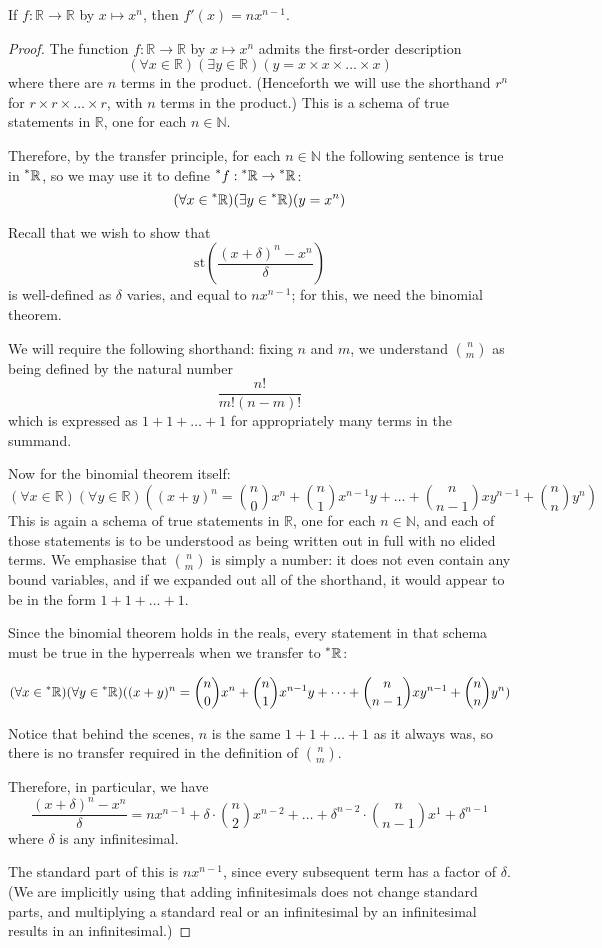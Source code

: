 \documentclass[11pt]{amsart}
\theoremstyle{remark}
\newcommand{\st}{\mathrm{st}}
\newcommand{\hyp}[1][\mathbb{R}]{\prescript{*}{}{#1}}
\begin{document}
\begin{thm} \label{thm:differentiatepolynomial}
If $f: \mathbb{R} \to \mathbb{R}$ by $x \mapsto x^n$, then $f'(x) = n x^{n-1}$.
\end{thm}
\begin{proof}
The function $f: \mathbb{R} \to \mathbb{R}$ by $x \mapsto x^n$ admits the first-order description $$(\forall x \in \mathbb{R})(\exists y \in \mathbb{R})(y = x \times x \times \dots \times x)$$
where there are $n$ terms in the product.
(Henceforth we will use the shorthand $r^n$ for $r \times r \times \dots \times r$, with $n$ terms in the product.)
This is a schema of true statements in $\mathbb{R}$, one for each $n \in \mathbb{N}$.

Therefore, by the transfer principle, for each $n \in \mathbb{N}$ the following sentence is true in $\hyp$, so we may use it to define $\hyp[f]: \hyp \to \hyp$: $$(\forall x \in \hyp)(\exists y \in \hyp)(y = x^n)$$

Recall that we wish to show that $$\st \left( \frac{(x+\delta)^n-x^n}{\delta} \right)$$ is well-defined as $\delta$ varies, and equal to $n x^{n-1}$; for this, we need the binomial theorem.

We will require the following shorthand: fixing $n$ and $m$, we understand $\binom{n}{m}$ as being defined by the natural number $$\frac{n!}{m! (n-m)!}$$
which is expressed as $1+1+\dots+1$ for appropriately many terms in the summand.

Now for the binomial theorem itself:
$$(\forall x \in \mathbb{R})(\forall y \in \mathbb{R})((x+y)^n = \binom{n}{0} x^n + \binom{n}{1} x^{n-1} y + \dots + \binom{n}{n-1} x y^{n-1} + \binom{n}{n} y^n)$$
This is again a schema of true statements in $\mathbb{R}$, one for each $n \in \mathbb{N}$, and each of those statements is to be understood as being written out in full with no elided terms.
We emphasise that $\binom{n}{m}$ is simply a number: it does not even contain any bound variables, and if we expanded out all of the shorthand, it would appear to be in the form $1+1+\dots+1$.

Since the binomial theorem holds in the reals, every statement in that schema must be true in the hyperreals when we transfer to $\hyp$:

$$(\forall x \in \hyp)(\forall y \in \hyp)((x+y)^n = \binom{n}{0} x^n + \binom{n}{1} x^{n-1} y + \dots + \binom{n}{n-1} x y^{n-1} + \binom{n}{n} y^n)$$

Notice that behind the scenes, $n$ is the same $1+1+\dots+1$ as it always was, so there is no transfer required in the definition of $\binom{n}{m}$.

Therefore, in particular, we have $$\frac{(x+\delta)^n-x^n}{\delta} = n x^{n-1} + \delta \cdot \binom{n}{2} x^{n-2} + \dots + \delta^{n-2} \cdot \binom{n}{n-1} x^1 + \delta^{n-1}$$
where $\delta$ is any infinitesimal.

The standard part of this is $n x^{n-1}$, since every subsequent term has a factor of $\delta$.
(We are implicitly using that adding infinitesimals does not change standard parts, and multiplying a standard real or an infinitesimal by an infinitesimal results in an infinitesimal.)
\end{proof}
\end{document}
